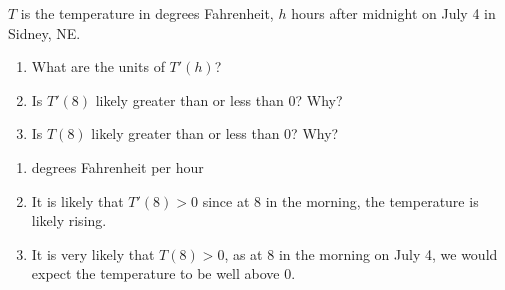 {$T$ is the temperature in degrees Fahrenheit, $h$ hours after midnight on July 4 in Sidney, NE. 
\begin{enumerate}
\item		What are the units of $T'(h)$?
\item		Is $T'(8)$ likely greater than or less than 0? Why?
\item		Is $T(8)$ likely greater than or less than 0? Why?
\end{enumerate}
}
{\begin{enumerate}
\item		degrees Fahrenheit per hour
\item		It is likely that $T'(8)>0$ since at 8 in the morning, the temperature is likely rising. 
\item		It is very likely that $T(8)>0$, as at 8 in the morning on July 4, we would expect the temperature to be well above 0.
\end{enumerate}
}
